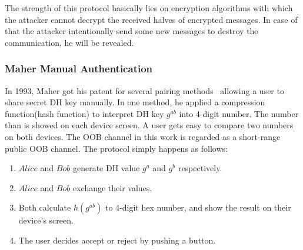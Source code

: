 The strength of this protocol basically lies on encryption algorithms with which the attacker cannot decrypt the received halves of encrypted messages. In case of that the attacker intentionally send some new messages to destroy the communication, he will be revealed. 

\subsubsection{Maher Manual Authentication}

In 1993, Maher got his patent for several pairing methods~\cite{maher} allowing a user to share secret DH key manually. In one method, he applied a compression function(hash function) to interpret DH key $g^{ab}$ into 4-digit number. The number than is showed on each device screen. A user gets easy to compare two numbers on both devices. The OOB channel in this work is regarded as a short-range public OOB channel. The protocol simply happens as follows: 
\begin{enumerate}
\item $Alice$ and $Bob$ generate DH value $g^a$ and $g^b$ respectively. 
\item $Alice$ and $Bob$ exchange their values. 
\item Both calculate $h(g^{ab})$ to 4-digit hex number, and show the result on their device's screen. 
\item The user decides accept or reject by pushing a button. 
\end{enumerate}

\begin{center}
\end{center}


